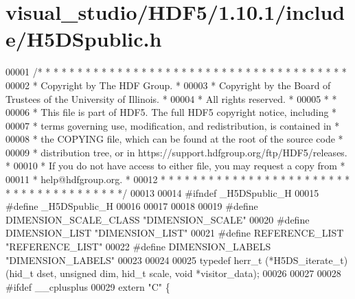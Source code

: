 \hypertarget{visual__studio_2_h_d_f5_21_810_81_2include_2_h5_d_spublic_8h_source}{}\section{visual\+\_\+studio/\+H\+D\+F5/1.10.1/include/\+H5\+D\+Spublic.h}
\label{visual__studio_2_h_d_f5_21_810_81_2include_2_h5_d_spublic_8h_source}

\begin{DoxyCode}
00001 \textcolor{comment}{/* * * * * * * * * * * * * * * * * * * * * * * * * * * * * * * * * * * * * * *}
00002 \textcolor{comment}{ * Copyright by The HDF Group.                                               *}
00003 \textcolor{comment}{ * Copyright by the Board of Trustees of the University of Illinois.         *}
00004 \textcolor{comment}{ * All rights reserved.                                                      *}
00005 \textcolor{comment}{ *                                                                           *}
00006 \textcolor{comment}{ * This file is part of HDF5.  The full HDF5 copyright notice, including     *}
00007 \textcolor{comment}{ * terms governing use, modification, and redistribution, is contained in    *}
00008 \textcolor{comment}{ * the COPYING file, which can be found at the root of the source code       *}
00009 \textcolor{comment}{ * distribution tree, or in https://support.hdfgroup.org/ftp/HDF5/releases.  *}
00010 \textcolor{comment}{ * If you do not have access to either file, you may request a copy from     *}
00011 \textcolor{comment}{ * help@hdfgroup.org.                                                        *}
00012 \textcolor{comment}{ * * * * * * * * * * * * * * * * * * * * * * * * * * * * * * * * * * * * * * */}
00013 
00014 \textcolor{preprocessor}{#ifndef \_H5DSpublic\_H}
00015 \textcolor{preprocessor}{#define \_H5DSpublic\_H}
00016 
00017 
00018 
00019 \textcolor{preprocessor}{#define DIMENSION\_SCALE\_CLASS "DIMENSION\_SCALE"}
00020 \textcolor{preprocessor}{#define DIMENSION\_LIST        "DIMENSION\_LIST"}
00021 \textcolor{preprocessor}{#define REFERENCE\_LIST        "REFERENCE\_LIST"}
00022 \textcolor{preprocessor}{#define DIMENSION\_LABELS      "DIMENSION\_LABELS"}
00023 
00024 
00025 \textcolor{keyword}{typedef} herr\_t  (*H5DS\_iterate\_t)(hid\_t dset, \textcolor{keywordtype}{unsigned} dim, hid\_t scale, \textcolor{keywordtype}{void} *visitor\_data);
00026 
00027 
00028 \textcolor{preprocessor}{#ifdef \_\_cplusplus}
00029 \textcolor{keyword}{extern} \textcolor{stringliteral}{"C"} \{

\end{DoxyCode}
